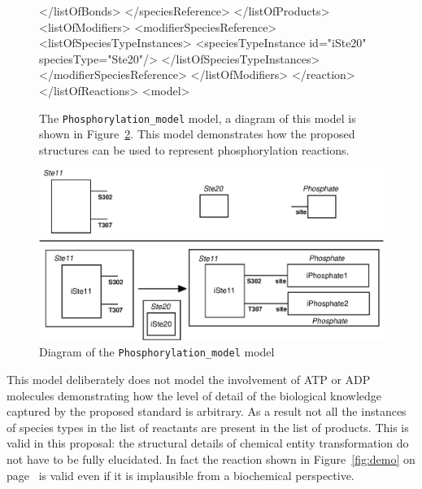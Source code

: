 \documentclass{cekarticle}
\begin{document}
\begin{figure}[h]
\begin{example}
                    </listOfBonds>
                </speciesReference>
            </listOfProducts>
            <listOfModifiers>
                <modifierSpeciesReference>
                    <listOfSpeciesTypeInstances>
                        <speciesTypeInstance id="iSte20" speciesType="Ste20"/>
                    </listOfSpeciesTypeInstances>
                </modifierSpeciesReference>
            </listOfModifiers>
        </reaction>
    </listOfReactions>
<model>
\end{example}
  \caption{The \texttt{Phosphorylation\_model} model, a diagram of this model is shown in
  Figure~\ref{fig:Phosphorylation_model}. This model demonstrates how the proposed structures can be
  used to represent phosphorylation reactions.}
  \label{fig:Phosphorylation_model-xml}
\end{figure}

\begin{figure}[h]
  \vspace*{8pt}
  \centering
  \includegraphics[scale = 0.7]{Phosphorylation-model.eps}
  \caption{Diagram of the \texttt{Phosphorylation\_model} model}
  \label{fig:Phosphorylation_model}
\end{figure}

This model deliberately does not model the involvement of ATP or ADP molecules demonstrating
how the level of detail of the biological knowledge captured by the proposed standard is arbitrary.
As a result not all the instances of species types in the list of reactants are present in the
list of products.  This is valid in this proposal: the structural details of chemical entity
transformation do not have to be fully elucidated.  In fact the reaction shown in
Figure~\ref{fig:demo} on page~\pageref{fig:demo} is valid even if it is implausible from a biochemical
perspective.
\end{document}
